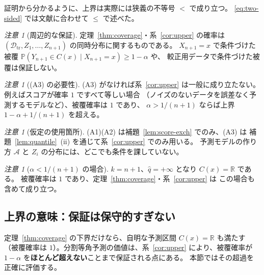\documentclass[a4paper,11pt]{jsarticle}
\theoremstyle{definition}
\theoremstyle{plain}
\theoremstyle{remark}
\newtheorem{remark}[definition]{注意}
\newcommand{\Prob}{\mathbb{P}}
\newcommand{\Real}{\mathbb{R}}
\newcommand{\Dtr}{\mathcal{D}_{\mathrm{tr}}}     %
\newcommand{\qhat}{\hat{q}}
\begin{document}
証明から分かるように、上界は実際には狭義の不等号 $<$ で成り立つ。
\eqref{eq:two-sided} では文献に合わせて $\le$ で述べた。

\begin{remark}[周辺的な保証]
  \label{rem:marginal}
  定理~\ref{thm:coverage}・系~\ref{cor:upper} の確率は
  $(\Dtr,Z_1,\dots,Z_{n+1})$ の同時分布に関するものである。
  $X_{n+1}=x$ で条件づけた被覆
  $\Prob(Y_{n+1}\in C(x)\mid X_{n+1}=x)\ge1-\alpha$ や、
  較正用データで条件づけた被覆は保証しない。
\end{remark}

\begin{remark}[(A3) の必要性]
  \label{rem:a3}
  (A3) がなければ系~\ref{cor:upper} は一般に成り立たない。
  例えばスコアが確率 $1$ ですべて等しい場合
  （ノイズのないデータを誤差なく予測するモデルなど）、被覆確率は $1$ であり、
  $\alpha>1/(n+1)$ ならば上界 $1-\alpha+1/(n+1)$ を超える。
\end{remark}

\begin{remark}[仮定の使用箇所]
  \label{rem:assumptions}
  (A1)(A2) は補題~\ref{lem:score-exch} でのみ、(A3) は
  補題~\ref{lem:quantile}~(ii) を通じて系~\ref{cor:upper} でのみ用いる。
  予測モデルの作り方 $\mathcal{A}$ と $Z_i$ の分布には、どこでも条件を課していない。
\end{remark}

\begin{remark}[$\alpha<1/(n+1)$ の場合]
  \label{rem:small-alpha}
  $k=n+1$、$\qhat=+\infty$ となり $C(x)=\Real$ である。
  被覆確率は $1$ であり、定理~\ref{thm:coverage}・系~\ref{cor:upper} は
  この場合も含めて成り立つ。
\end{remark}

\subsection{上界の意味：保証は保守的すぎない}
\label{sec:upper-meaning}

定理~\ref{thm:coverage} の下界だけなら、自明な予測区間 $C(x)=\Real$ も満たす
（被覆確率は $1$）。分割等角予測の価値は、系~\ref{cor:upper} により、被覆確率が
$1-\alpha$ を\textbf{ほとんど超えない}ことまで保証される点にある。
本節ではその超過を正確に評価する。
\end{document}
